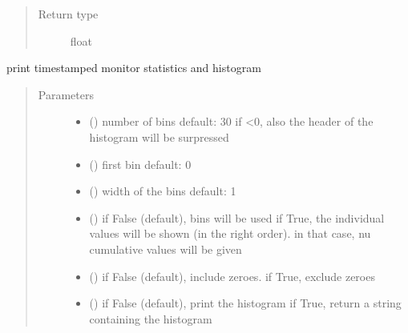 \documentclass[letterpaper,10pt,english]{sphinxmanual}
\begin{document}
\begin{fulllineitems}
\begin{fulllineitems}
\begin{quote}
\begin{description}
\item[{Return type}] \leavevmode
float

\end{description}\end{quote}

\end{fulllineitems}


\begin{fulllineitems}
\label{\detokenize{Reference:salabim.MonitorTimestamp.print_histogram}}
print timestamped monitor statistics and histogram
\begin{quote}\begin{description}
\item[{Parameters}] \leavevmode\begin{itemize}
\item {} 
 () \textendash{} number of bins 
default: 30 
if \textless{}0, also the header of the histogram will be surpressed

\item {} 
 () \textendash{} first bin 
default: 0

\item {} 
 () \textendash{} width of the bins 
default: 1

\item {} 
 () \textendash{} if False (default), bins will be used 
if True, the individual values will be shown (in the right order).
in that case, nu cumulative values will be given 

\item {} 
 () \textendash{} if False (default), include zeroes. if True, exclude zeroes

\item {} 
 () \textendash{} if False (default), print the histogram
if True, return a string containing the histogram


\end{itemize}
\end{description}
\end{quote}
\end{fulllineitems}
\end{fulllineitems}
\end{document}
